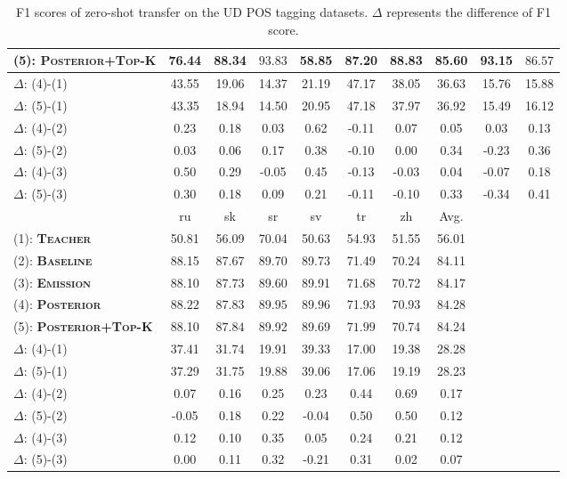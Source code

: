 \documentclass[11pt,a4paper]{article}
\begin{document}
\begin{table*}[t]
\begin{tabular}{l|ccccccccc}
(5): {\bf\textsc{Posterior+Top-K}}  & 76.44 & 88.34 & $\mathbf{93.83}$ & 58.85 & 87.20 & 88.83 & 85.60 & 93.15 & $\mathbf{86.57}$ \\
\hline
$\Delta$: (4)-(1) & 43.55 & 19.06 & 14.37 & 21.19 & 47.17 & 38.05 & 36.63 & 15.76 & 15.88 \\
$\Delta$: (5)-(1) & 43.35 & 18.94 & 14.50 & 20.95 & 47.18 & 37.97 & 36.92 & 15.49 & 16.12 \\
$\Delta$: (4)-(2) & 0.23 & 0.18 & 0.03 & 0.62 & -0.11 & 0.07 & 0.05 & 0.03 & 0.13 \\
$\Delta$: (5)-(2) & 0.03 & 0.06 & 0.17 & 0.38 & -0.10 & 0.00 & 0.34 & -0.23 & 0.36 \\
$\Delta$: (4)-(3) & 0.50 & 0.29 & -0.05 & 0.45 & -0.13 & -0.03 & 0.04 & -0.07 & 0.18 \\
$\Delta$: (5)-(3) & 0.30 & 0.18 & 0.09 & 0.21 & -0.11 & -0.10 & 0.33 & -0.34 & 0.41 \\
 \hline\hline
 & ru & sk & sr & sv & tr & zh & Avg. &  &  \\
 \hline
(1): {\bf\textsc{Teacher}}  & 50.81 & 56.09 & 70.04 & 50.63 & 54.93 & 51.55 & 56.01 &  &  \\
(2): {\bf\textsc{Baseline}}  & 88.15 & 87.67 & 89.70 & 89.73 & 71.49 & 70.24 & 84.11 &  &  \\
(3): {\bf\textsc{Emission}}  & 88.10 & 87.73 & 89.60 & 89.91 & 71.68 & 70.72 & 84.17 &  &  \\
(4): {\bf\textsc{Posterior}}  & $\mathbf{88.22}$ & 87.83 & $\mathbf{89.95}$ & $\mathbf{89.96}$ & 71.93 & $\mathbf{70.93}$ & $\mathbf{84.28}$ &  &  \\
(5): {\bf\textsc{Posterior+Top-K}}  & 88.10 & $\mathbf{87.84}$ & 89.92 & 89.69 & $\mathbf{71.99}$ & 70.74 & 84.24 &  &  \\
\hline
$\Delta$: (4)-(1) & 37.41 & 31.74 & 19.91 & 39.33 & 17.00 & 19.38 & 28.28 &  &  \\
$\Delta$: (5)-(1) & 37.29 & 31.75 & 19.88 & 39.06 & 17.06 & 19.19 & 28.23 &  &  \\
$\Delta$: (4)-(2) & 0.07 & 0.16 & 0.25 & 0.23 & 0.44 & 0.69 & 0.17 &  &  \\
$\Delta$: (5)-(2) & -0.05 & 0.18 & 0.22 & -0.04 & 0.50 & 0.50 & 0.12 &  &  \\
$\Delta$: (4)-(3) & 0.12 & 0.10 & 0.35 & 0.05 & 0.24 & 0.21 & 0.12 &  &  \\
$\Delta$: (5)-(3) & 0.00 & 0.11 & 0.32 & -0.21 & 0.31 & 0.02 & 0.07 &  & \\
\hline\hline
\end{tabular}
\caption{F1 scores of zero-shot transfer on the UD POS tagging datasets. $\Delta$ represents the difference of F1 score.}
\label{tab:zs_pos}
\end{table*}
\end{document}

